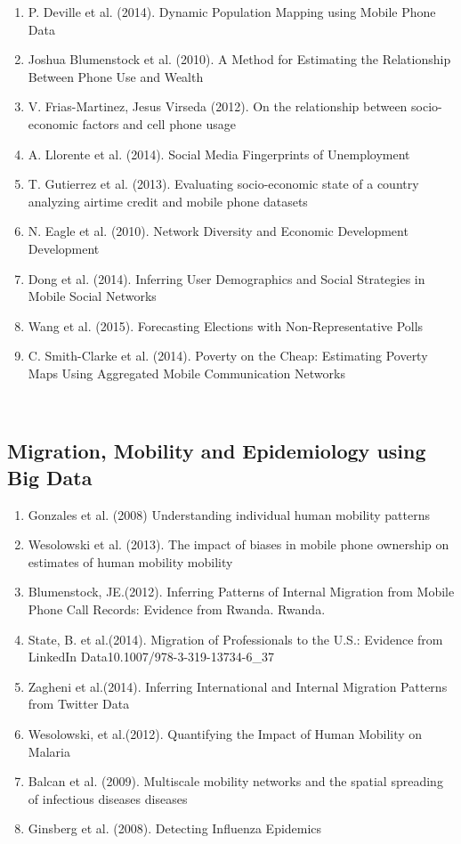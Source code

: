 \begin{enumerate}  
\item  P. Deville et al. (2014).  Dynamic Population Mapping using Mobile Phone Data\cite{Deville_2014} 
\item  Joshua Blumenstock et al. (2010).  A Method for Estimating the Relationship Between Phone Use and Wealth\cite{blumenstock2010method}  
\item  V. Frias-Martinez, Jesus Virseda (2012).  On the relationship between socio-economic factors and cell phone usage \cite{Frias_Martinez_2012} 
\item A. Llorente et al. (2014).  Social Media Fingerprints of Unemployment\cite{Llorente_2015}  
\item T. Gutierrez et al. (2013).  Evaluating socio-economic state of a country analyzing airtime credit and mobile phone datasets\cite{gutierrez2013evaluating}  \item N. Eagle et al. (2010).  Network Diversity and Economic Development\cite{eagle2010network} Development  \item Dong et al. (2014).  Inferring User Demographics and Social Strategies in Mobile Social Networks \cite{Dong:2014:IUD:2623330.2623703} \item Wang et al. (2015).  Forecasting Elections with Non-Representative Polls\cite{Wang2015980} \item C. Smith-Clarke et al. (2014).  Poverty on the Cheap: Estimating Poverty Maps Using Aggregated Mobile Communication Networks\cite{Smith-Clarke:2014:PCE:2556288.2557358} \end{enumerate}  \\  \subsection{Migration, Mobility and Epidemiology using Big Data}  \begin{enumerate}  \item Gonzales et al. (2008)  Understanding individual human mobility patterns\cite{Gonz_lez_2008} \item Wesolowski et al. (2013).  The impact of biases in mobile phone ownership on estimates of human mobility\cite{Wesolowski_2013} mobility  \item  Blumenstock, JE.(2012).  Inferring Patterns of Internal Migration from Mobile Phone Call Records: Evidence from Rwanda\cite{Blumenstock_2012}. Rwanda.  \item  State, B. et al.(2014).  Migration of Professionals to the U.S.: Evidence from LinkedIn Data10.1007/978-3-319-13734-6_37\cite{State_2014}  \item  Zagheni et al.(2014).  Inferring International and Internal Migration Patterns from Twitter Data\cite{Zagheni:2014:III:2567948.2576930}  \item  Wesolowski, et al.(2012).  Quantifying the Impact of Human Mobility on Malaria \cite{Wesolowski_2012} \item Balcan et al. (2009).  Multiscale mobility networks and the spatial spreading of infectious diseases\cite{Balcan_2009} diseases  \item Ginsberg et al. (2008).  Detecting Influenza Epidemics 
\end{enumerate}
